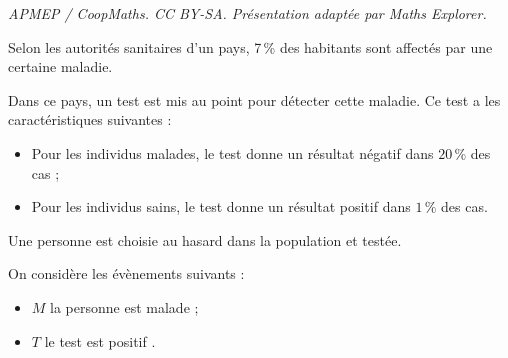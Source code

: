 \documentclass[10pt]{article}
\begin{document}
\noindent\textit{APMEP / CoopMaths. CC BY-SA. Présentation adaptée par Maths Explorer.}\par\medskip
\medskip

Selon les autorités sanitaires d'un pays, 7\,\% des habitants sont affectés par une certaine maladie.

Dans ce pays, un test est mis au point pour détecter cette maladie. Ce test a les caractéristiques suivantes :
\setlength\parindent{1cm}
\begin{itemize}
\item[$\bullet~~$] Pour les individus malades, le test donne un résultat négatif dans $20 \,\%$ des cas ;
\item[$\bullet~~$] Pour les individus sains, le test donne un résultat positif dans $1\,\%$ des cas.
\end{itemize}
\setlength\parindent{0cm}

Une personne est choisie au hasard dans la population et testée.

On considère les évènements suivants :

\setlength\parindent{1cm}
\begin{itemize}
\item[$\bullet~~$] $M$ \og la personne est malade \fg{} ;
\item[$\bullet~~$]  $T$ \og le test est positif \fg{}.
\end{itemize}
\setlength\parindent{0cm}

\medskip
\end{document}
